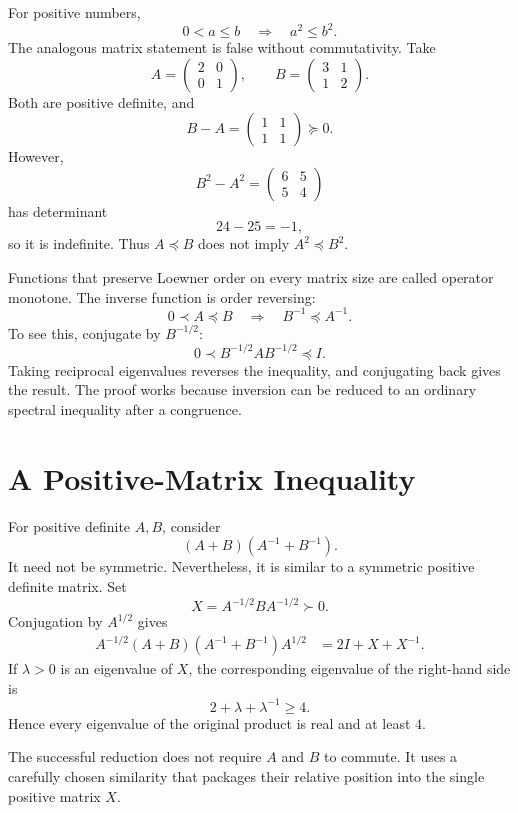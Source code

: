 For positive numbers,
\[
  0<a\le b
  \quad\Longrightarrow\quad
  a^2\le b^2.
\]
The analogous matrix statement is false without commutativity.  Take
\[
  A=
  \begin{pmatrix}
    2&0\\
    0&1
  \end{pmatrix},
  \qquad
  B=
  \begin{pmatrix}
    3&1\\
    1&2
  \end{pmatrix}.
\]
Both are positive definite, and
\[
  B-A=
  \begin{pmatrix}
    1&1\\
    1&1
  \end{pmatrix}
  \succeq0.
\]
However,
\[
  B^2-A^2
  =
  \begin{pmatrix}
    6&5\\
    5&4
  \end{pmatrix}
\]
has determinant
\[
  24-25=-1,
\]
so it is indefinite.  Thus \(A\preceq B\) does not imply \(A^2\preceq B^2\).

Functions that preserve Loewner order on every matrix size are called operator monotone.  The inverse function is order reversing:
\[
  0\prec A\preceq B
  \quad\Longrightarrow\quad
  B^{-1}\preceq A^{-1}.
\]
To see this, conjugate by \(B^{-1/2}\):
\[
  0\prec B^{-1/2}AB^{-1/2}\preceq I.
\]
Taking reciprocal eigenvalues reverses the inequality, and conjugating back gives the result.  The proof works because inversion can be reduced to an ordinary spectral inequality after a congruence.

\section{A Positive-Matrix Inequality}

For positive definite \(A,B\), consider
\[
  (A+B)(A^{-1}+B^{-1}).
\]
It need not be symmetric.  Nevertheless, it is similar to a symmetric positive definite matrix.  Set
\[
  X=A^{-1/2}BA^{-1/2}\succ0.
\]
Conjugation by \(A^{1/2}\) gives
\[
\begin{aligned}
  A^{-1/2}(A+B)(A^{-1}+B^{-1})A^{1/2}
  &=2I+X+X^{-1}.
\end{aligned}
\]
If \(\lambda>0\) is an eigenvalue of \(X\), the corresponding eigenvalue of the right-hand side is
\[
  2+\lambda+\lambda^{-1}\ge4.
\]
Hence every eigenvalue of the original product is real and at least \(4\).

The successful reduction does not require \(A\) and \(B\) to commute.  It uses a carefully chosen similarity that packages their relative position into the single positive matrix \(X\).

